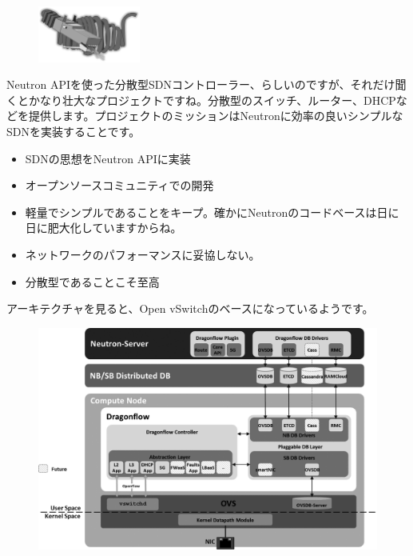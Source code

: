 \begin{figure}
	\vspace*{-2\intextsep}
	\begin{center}
		\includegraphics[width=0.3\textwidth]{img/Df_logo.png}
	\end{center}
\end{figure}

Neutron APIを使った分散型SDNコントローラー、らしいのですが、それだけ聞くとかなり壮大なプロジェクトですね。分散型のスイッチ、ルーター、DHCPなどを提供します。プロジェクトのミッションはNeutronに効率の良いシンプルなSDNを実装することです。

\begin{itemize}
	\item SDNの思想をNeutron APIに実装
	\item オープンソースコミュニティでの開発
	\item 軽量でシンプルであることをキープ。確かにNeutronのコードベースは日に日に肥大化していますからね。
	\item ネットワークのパフォーマンスに妥協しない。
	\item 分散型であることこそ至高
\end{itemize}

アーキテクチャを見ると、Open vSwitchのベースになっているようです。

\begin{figure}[htb]
	\begin{center}
		\includegraphics[width=\textwidth]{img/dragonflow_distributed_architecture.png}
	\end{center}
\end{figure}

